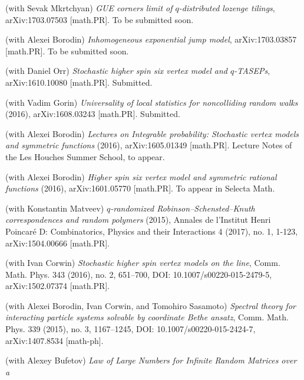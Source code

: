 \documentclass[letterpaper,11pt]{article}
\begin{document}
\begin{etaremune}
	\renewcommand{\labelenumi}{[\theenumi]}
	\item
	      (with Sevak Mkrtchyan)
	      \emph{GUE corners limit of $q$-distributed lozenge
		      tilings},
	      arXiv:1703.07503 [math.PR]. To be submitted soon.
	\item
	      (with Alexei Borodin)
	      \emph{Inhomogeneous exponential jump model},
	      arXiv:1703.03857 [math.PR]. To be submitted soon.
	\item
	      (with Daniel Orr)
	      \emph{Stochastic higher spin six vertex model and $q$-TASEPs},
	      arXiv:1610.10080 [math.PR]. Submitted.
	\item
	      (with Vadim Gorin)
	      \emph{Universality of local statistics for noncolliding random
		      walks}
	      (2016),
	      arXiv:1608.03243 [math.PR]. Submitted.
	\item
	      (with Alexei Borodin)
	      \emph{Lectures on Integrable probability: Stochastic vertex
		      models and
		      symmetric functions}
	      (2016), arXiv:1605.01349 [math.PR]. Lecture Notes of the Les
	      Houches
	      Summer School, to appear.
	\item
	      (with Alexei Borodin)
	      \emph{Higher spin six vertex model and symmetric rational
		      functions}
	      (2016),
	      arXiv:1601.05770 [math.PR]. To appear in Selecta Math.
	\item
	      (with Konstantin Matveev)
	      \emph{$q$-randomized Robinson--Schensted--Knuth correspondences
		      and random
		      polymers}
	      (2015),
	      Annales de l'Institut Henri Poincar\'e D:
	      Combinatorics, Physics and their Interactions
	      4 (2017), no. 1, 1-123,
	      arXiv:1504.00666 [math.PR].
	\item
	      (with Ivan Corwin)
	      \emph{Stochastic higher spin vertex models on the line},
	      Comm. Math. Phys.
	      343 (2016), no. 2,
	      651--700,
	      DOI: 10.1007/s00220-015-2479-5,
	      arXiv:1502.07374 [math.PR].
	\item
	      (with Alexei Borodin, Ivan Corwin, and Tomohiro Sasamoto)
	      \emph{Spectral theory for interacting particle systems solvable
		      by
		      coordinate Bethe ansatz},
	      Comm. Math. Phys.
	      339 (2015), no. 3,
	      1167--1245,
	      DOI: 10.1007/s00220-015-2424-7,
	      arXiv:1407.8534 [math-ph].
	\item
	      (with Alexey Bufetov)
	      \emph{Law of Large Numbers for Infinite Random Matrices over a
}
\end{etaremune}
\end{document}
